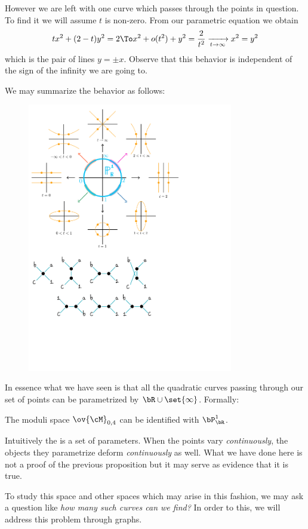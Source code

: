 \documentclass[12pt]{memoir}
\begin{document}
However we are left with one curve which passes through the points in question. To find it we will assume $t$ is non-zero. From our parametric equation we obtain 
$$tx^2+(2-t)y^2=2\To x^2+o(t^2)+y^2=\frac{2}{t^2}\xrightarrow[t\to\infty]{}x^2=y^2$$
which is the pair of lines $y=\pm x$. Observe that this behavior is independent of the sign of the infinity we are going to.\par 
We may summarize the behavior as follows:\par
\begin{figure}[h!]
    \centering
    \includegraphics[width=0.8\textwidth, trim= 0.25cm 13.1cm 5.25cm 0.5cm,clip]{fig2.pdf}
\end{figure}
In essence what we have seen is that all the quadratic curves passing through our set of points can be parametrized by $\bR\cup\set{\infty}$. Formally:
\begin{Prop}
The moduli space $\ov{\cM}_{0,4}$ can be identified with $\bP^1_\bR$.
\end{Prop}
Intuitively the  is a set of parameters. When the points vary \emph{continuously}, the objects they parametrize deform \emph{continuously} as well. What we have done here is not a proof of the previous proposition but it may serve as evidence that it is true.\par 
To study this space and other spaces which may arise in this fashion, we may ask a question like \emph{how many such curves can we find?} In order to this, we will address this problem through graphs. 
\end{document}
